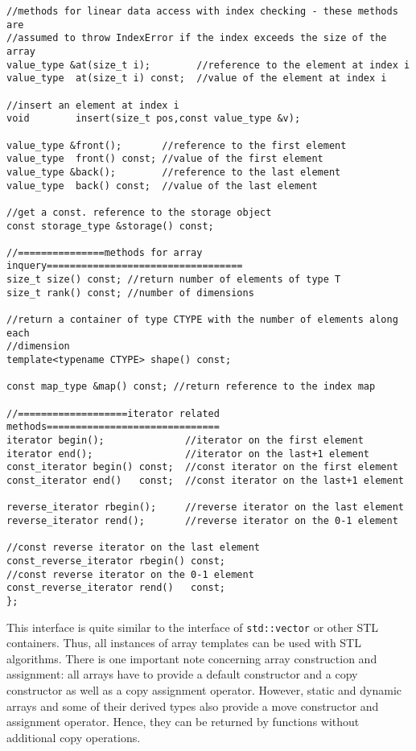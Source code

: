 \begin{verbatim}
//methods for linear data access with index checking - these methods are
//assumed to throw IndexError if the index exceeds the size of the array
value_type &at(size_t i);        //reference to the element at index i
value_type  at(size_t i) const;  //value of the element at index i

//insert an element at index i
void        insert(size_t pos,const value_type &v);

value_type &front();       //reference to the first element
value_type  front() const; //value of the first element
value_type &back();        //reference to the last element
value_type  back() const;  //value of the last element

//get a const. reference to the storage object
const storage_type &storage() const;

//===============methods for array inquery==================================
size_t size() const; //return number of elements of type T
size_t rank() const; //number of dimensions

//return a container of type CTYPE with the number of elements along each
//dimension
template<typename CTYPE> shape() const;

const map_type &map() const; //return reference to the index map

//===================iterator related methods==============================
iterator begin();              //iterator on the first element
iterator end();                //iterator on the last+1 element
const_iterator begin() const;  //const iterator on the first element
const_iterator end()   const;  //const iterator on the last+1 element

reverse_iterator rbegin();     //reverse iterator on the last element
reverse_iterator rend();       //reverse iterator on the 0-1 element

//const reverse iterator on the last element
const_reverse_iterator rbegin() const; 
//const reverse iterator on the 0-1 element
const_reverse_iterator rend()   const;
};
\end{verbatim}

This interface is quite similar to the interface of {\tt std::vector} or other
STL containers. Thus, all instances of array templates can be used with STL
algorithms. There is one important note concerning array construction and
assignment: all arrays have to provide a default constructor and a copy
constructor as well as a copy assignment operator. However, static and dynamic
arrays and some of their derived types also provide a move constructor and
assignment operator. Hence, they can be returned by functions without additional
copy operations.
